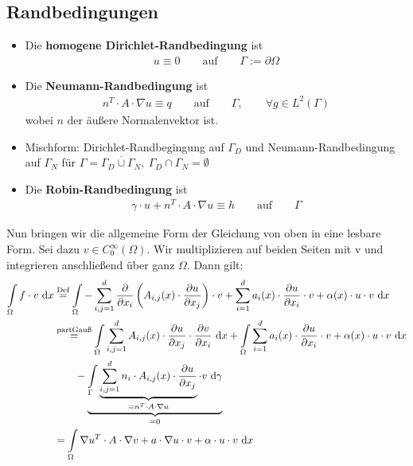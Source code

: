 \subsection*{Randbedingungen}
\begin{itemize}
\item Die \textbf{homogene Dirichlet-Randbedingung} ist
\begin{align*}
u\equiv0\qquad\text{auf}\qquad\Gamma:=\partial\Omega
\end{align*}
\item Die \textbf{Neumann-Randbedingung} ist
\begin{align*}
n^T\cdot A\cdot\nabla u\equiv q\qquad\text{auf}\qquad\Gamma,\qquad\forall g\in L^2(\Gamma)
\end{align*}
wobei $n$ der äußere Normalenvektor ist.
\item Mischform: Dirichlet-Randbegingung auf $\Gamma_D$ und Neumann-Randbedingung auf $\Gamma_N$ für $\Gamma=\Gamma_D\stackrel{\cdot}{\cup}\Gamma_N,~\Gamma_D\cap\Gamma_N=\emptyset$
\item Die \textbf{Robin-Randbedingung} ist
\begin{align*}
\gamma\cdot u+n^T\cdot A\cdot\nabla u\equiv h\qquad\text{auf}\qquad\Gamma
\end{align*}
\end{itemize}

Nun bringen wir die allgemeine Form der Gleichung von oben in eine lesbare Form.
Sei dazu $v\in C_0^\infty(\Omega)$. Wir multiplizieren auf beiden Seiten mit v und integrieren anschließend über ganz $\Omega$. Dann gilt:
\begin{align*}
\int\limits_\Omega f\cdot v\text{ d} x
&\stackrel{\text{Def}}{=}
\int\limits_\Omega-\sum\limits_{i,j=1}^d\frac{\partial}{\partial x_i}\left(A_{i,j}(x)\cdot\frac{\partial u}{\partial x_j}\right)\cdot v+\sum\limits_{i=1}^d a_i(x)\cdot\frac{\partial u}{\partial x_i}\cdot v+\alpha(x)\cdot u\cdot v\text{ d} x\\ 
&\stackrel{\text{partGauß}}{=}
\int\limits_\Omega\sum\limits_{i,j=1}^d A_{i,j}(x)\cdot\frac{\partial u}{\partial x_j}\cdot\frac{\partial v}{\partial x_i}\text{ d} x+\int\limits_\Omega\sum\limits_{i=1}^d a_i(x)\cdot\frac{\partial u}{\partial x_i}\cdot v+\alpha(x)\cdot u\cdot v\text{ d} x\\
&\qquad
-\underbrace{\int\limits_\Gamma\underbrace{\sum\limits_{i,j=1}^d n_i\cdot A_{i,j}(x)\cdot\frac{\partial u}{\partial x_j}}_{=n^T\cdot A\cdot\nabla u}\cdot v\text{ d}\gamma}_{=0}\\
&=
\int\limits_\Omega\nabla u^T\cdot A\cdot\nabla v+a\cdot\nabla u\cdot v+\alpha\cdot u\cdot v\text{ d} x
\end{align*}

